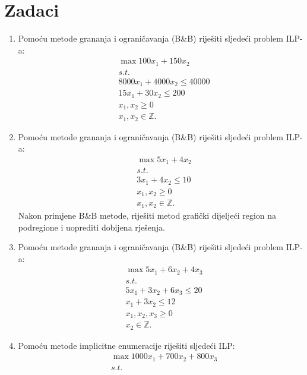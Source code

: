 \documentclass[a4paper, utf8, 11pt, colorlinks]{book}
\begin{document}
 \section{Zadaci}
 \begin{enumerate}
 	\item %
 	Pomoću metode grananja i ograničavanja (B\&B) riješiti sljedeći problem ILP-a:
 	\begin{align*}
 		&\max 100 x_1 + 150 x_2 \\
 		& s.t. \\
 		& 8000 x_1 + 4000 x_2 \leq 40 000 \\
 		& 15 x_1 + 30 x_2 \leq 200 \\
 		& x_1, x_2 \geq 0 \\
 		& x_1, x_2 \in \mathbb{Z}.
 	\end{align*}
   \item %
   	Pomoću metode grananja i ograničavanja  (B\&B) riješiti sljedeći problem ILP-a:
   \begin{align*}
   	    &\max 5 x_1 + 4 x_2 \\
   	    & s.t. \\
   	    & 3 x_1 + 4 x_2 \leq 10 \\
   	    & x_1, x_2 \geq 0 \\
   	    & x_1, x_2 \in \mathbb{Z}.
   \end{align*}
Nakon primjene B\&B metode, riješiti metod grafički dijeljeći region na podregione i uoprediti dobijena rješenja. 
\item 	Pomoću metode grananja i ograničavanja  (B\&B) riješiti sljedeći problem ILP-a:
\begin{align*}
	 &\max 5x_1 + 6 x_2 + 4 x_3 \\
	 &s.t. \\
	 & 5x_1 + 3 x_2 + 6 x_3 \leq 20 \\
	 & x_1 + 3x_2 \leq 12 \\
	 & x_1,x_2, x_3 \geq 0 \\
	 & x_2 \in \mathbb{Z}.
\end{align*}
\item %
 Pomoću metode implicitne enumeracije riješiti sljedeći ILP:
\begin{align*}
  &\max 1000 x_1 + 700 x_2 + 800 x_3 \\
  &s.t. \\

\end{align*}
\end{enumerate}
\end{document}
